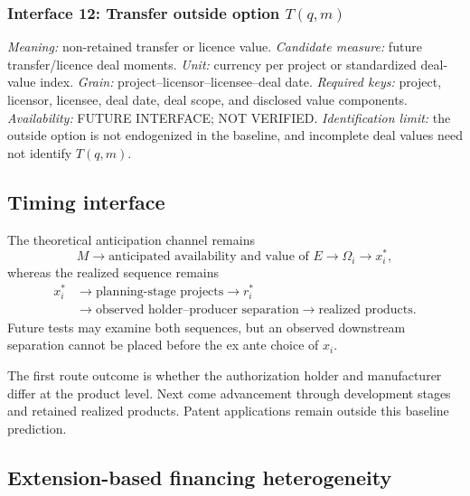\subsubsection{Interface 12: Transfer outside option \texorpdfstring{\(T(q,m)\)}{transfer value}}
\textit{Meaning:} non-retained transfer or licence value.
\textit{Candidate measure:} future transfer/licence deal moments.
\textit{Unit:} currency per project or standardized deal-value index.
\textit{Grain:} project--licensor--licensee--deal date.
\textit{Required keys:} project, licensor, licensee, deal date, deal scope,
and disclosed value components.
\textit{Availability:} FUTURE INTERFACE; NOT VERIFIED.
\textit{Identification limit:} the outside option is not endogenized in the
baseline, and incomplete deal values need not identify \(T(q,m)\).

\subsection{Timing interface}
\label{subsec:p10-timing}

The theoretical anticipation channel remains
\begin{equation}
  M
  \longrightarrow
  \text{anticipated availability and value of }E
  \longrightarrow
  \Omega_i
  \longrightarrow
  x_i^*,
  \label{eq:p10-anticipated-interface}
\end{equation}
whereas the realized sequence remains
\begin{equation}
  \begin{aligned}
  x_i^*
  &\longrightarrow
  \text{planning-stage projects}
  \longrightarrow r_i^* \\
  &\longrightarrow
  \text{observed holder--producer separation}
  \longrightarrow
  \text{realized products}.
  \end{aligned}
  \label{eq:p10-realized-interface}
\end{equation}
Future tests may examine both sequences, but an observed downstream separation
cannot be placed before the ex ante choice of \(x_i\).

The first route outcome is whether the authorization holder and manufacturer
differ at the product level. Next come advancement through development stages
and retained realized products. Patent applications remain outside this
baseline prediction.

\subsection{Extension-based financing heterogeneity}
\label{subsec:p10-finance-extension}

